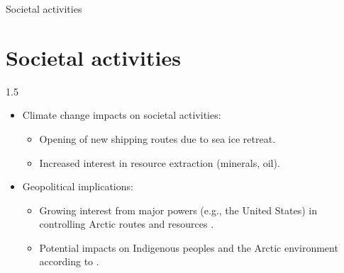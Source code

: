 \begin{frame}{Societal activities}
    \section{Societal activities}
    \begin{spacing}{1.5} 
  \begin{itemize}

    \item Climate change impacts on societal activities:
    \begin{itemize}
      \item Opening of new shipping routes due to sea ice retreat.
      \item Increased interest in resource extraction (minerals, oil).
    \end{itemize}
    \item Geopolitical implications:
    \begin{itemize}
      \item Growing interest from major powers (e.g., the United States) in controlling Arctic routes and resources \citep{CongressionalResearchService2026}.
      \item Potential impacts on Indigenous peoples and the Arctic environment according to \citet{IPCC2023}.
    \end{itemize}

  \end{itemize}
  \end{spacing}
\end{frame}